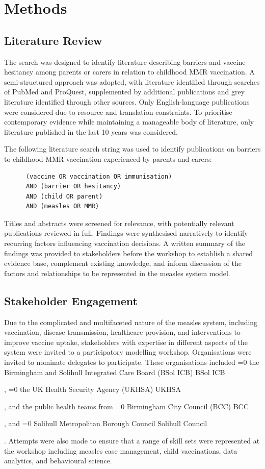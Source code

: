 \documentclass[12pt]{article}
\newcounter{bcc}
\newcommand{\bcc}{%
    \ifnum\value{bcc}=0
        \stepcounter{bcc}%
        Birmingham City Council (BCC)%
        \else
        BCC%
    \fi%
    \xspace
}
\newcounter{bsol}
\newcounter{solihull}
\newcommand{\solihull}{%
    \ifnum\value{solihull}=0
        \stepcounter{bcc}%
        Solihull Metropolitan Borough Council%
    \else
        Solihull Council%
    \fi%
    \xspace
}
\newcounter{ukhsa}
\newcommand{\ukhsa}{%
    \ifnum\value{ukhsa}=0
        \stepcounter{ukhsa}%
        the UK Health Security Agency (UKHSA)%
    \else
        UKHSA%
    \fi%
    \xspace
}
\newcounter{bsolicb}
\newcommand{\bsolicb}{%
    \ifnum\value{bsolicb}=0
        \stepcounter{bsolicb}%
        the Birmingham and Solihull Integrated Care Board (BSol ICB)%
    \else
        BSol ICB%
    \fi%
    \xspace
}
\begin{document}
\section{Methods}

\subsection{Literature Review}

The search was designed to identify literature describing barriers and vaccine hesitancy among parents or carers in relation to childhood MMR vaccination. A semi-structured approach was adopted, with literature identified through searches of PubMed and ProQuest, supplemented by additional publications and grey literature identified through other sources. Only English-language publications were considered due to resource and translation constraints. To prioritise contemporary evidence while maintaining a manageable body of literature, only literature published in the last 10 years was considered.

The following literature search string was used to identify publications on barriers to childhood MMR vaccination experienced by parents and carers:

\begin{verbatim}
      (vaccine OR vaccination OR immunisation)
      AND (barrier OR hesitancy)
      AND (child OR parent) 
      AND (measles OR MMR)
\end{verbatim}

Titles and abstracts were screened for relevance, with potentially relevant publications reviewed in full. Findings were synthesised narratively to identify recurring factors influencing vaccination decisions. A written summary of the findings was provided to stakeholders before the workshop to establish a shared evidence base, complement existing knowledge, and inform discussion of the factors and relationships to be represented in the measles system model.

\subsection{Stakeholder Engagement}

Due to the complicated and multifaceted nature of the measles system, including vaccination, disease transmission, healthcare provision, and interventions to improve vaccine uptake, stakeholders with expertise in different aspects of the system were invited to a participatory modelling workshop. Organisations were invited to nominate delegates to participate. These organisations included \bsolicb, \ukhsa, and the public health teams from \bcc, and \solihull. Attempts were also made to ensure that a range of skill sets were represented at the workshop including measles case management, child vaccinations, data analytics, and behavioural science. 
\end{document}
